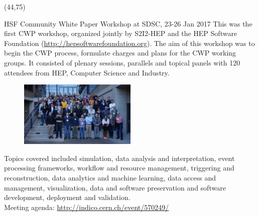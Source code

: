 \documentclass[final]{beamer}
\begin{document}
\begin{frame}{}
\begin{textblock}{38.0}(44,75)
\begin{block}{HSF Community White Paper Workshop at SDSC, 23-26 Jan 2017}
This was the first CWP workshop, organized jointly by S2I2-HEP and the HEP Software Foundation (\url{http://hepsoftwarefoundation.org}). The aim of this workshop was to begin the CWP process, formulate charges and plans for the CWP working groups. It consisted of plenary sessions, parallels and topical panels with 120 attendees from HEP, Computer Science and Industry.
\begin{figure}[tbph]
\centering
\includegraphics[width=0.50\textwidth]{images/20170125-HSF-SDSC-Workshop-group-photo.jpg}
\end{figure}
Topics covered included simulation, data analysis and interpretation, event processing frameworks, workflow and resource management, triggering and reconstruction, data analytics and machine learning, data access and management, visualization, data and software preservation and software development, deployment and validation. \\
\small{Meeting agenda: \url{http://indico.cern.ch/event/570249/}} \\

\end{block}
\end{textblock}


\end{frame}
\end{document}
